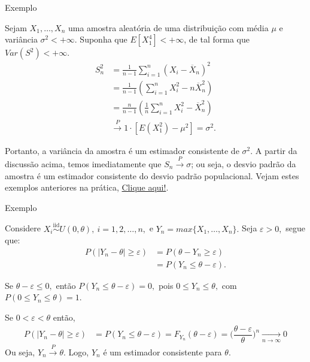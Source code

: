 \documentclass[12pt]{beamer}
\begin{document}
\begin{frame}{Exemplo}
\begin{block}{}
\justifying
Sejam $X_1, \ldots, X_{n}$ uma amostra aleatória de uma distribuição com média $\mu$ e variância $\sigma^{2}<+\infty$. Suponha que $E[X^{4}_{1}] < +\infty$, de tal forma que $Var(S^{2}) < +\infty$. 
\begin{align*}
S^2_{n} &= \frac{1}{n-1} \sum_{i=1}^n (X_i - \overline{X}_{n})^2 \\
&=\frac{1}{n-1} \left(\sum_{i=1}^n X_{i}^{2} - n\overline{X}_{n}^{2}\right)\\
&= \frac{n}{n-1} \left(\frac{1}{n}\sum_{i=1}^n X^2_i - \overline{X}^{2}_{n}\right) \\
&\xrightarrow{P} 1 \cdot [E(X^2_1) - \mu^2] = \sigma^2.
\end{align*}
\end{block}
\end{frame}

\begin{frame}{}
\begin{block}{}
\justifying
Portanto, a variância da amostra é um estimador consistente de $\sigma^2$. A partir da discussão acima, temos imediatamente que $S_{n} \xrightarrow{P} \sigma$; ou seja, o desvio padrão da amostra é um estimador consistente do desvio padrão populacional. Vejam estes exemplos anteriores na prática, \href{https://est711.shinyapps.io/ConvergenciaProbabilidade/}{Clique aqui!}.
\end{block}
\end{frame}

\begin{frame}{Exemplo}
\vspace{-0.3cm}
\begin{block}{}
\justifying
Considere $X_{i}\overset{\text{iid}}{\sim} U(0,\theta),~i=1,2,\ldots,n,$ e $Y_{n}=max\{X_{1}, \ldots, X_{n}\}.$ Seja $\varepsilon>0,$ segue que:
\begin{align*}
    P(|Y_{n}-\theta|\geq \varepsilon)&=P(\theta-Y_{n}\geq \varepsilon)\\
    &=P(Y_{n}\leq \theta-\varepsilon).
\end{align*}
\end{block}
\pause
\begin{block}{}
\justifying
Se $\theta-\varepsilon\leq 0,$ então $P(Y_{n}\leq \theta-\varepsilon)=0,$ pois $0\leq Y_{n}\leq \theta,$ com $P(0\leq Y_{n}\leq \theta)=1.$
\end{block}
\pause
\begin{block}{}
\justifying
Se $0<\varepsilon<\theta$ então,
\begin{align*}
P(|Y_{n}-\theta|\geq \varepsilon)&=P(Y_{n}\leq \theta- \varepsilon)=F_{Y_{n}}(\theta-\varepsilon)=\Big(\dfrac{\theta-\varepsilon}{\theta}\Big)^{n}\xrightarrow[n\rightarrow\infty]{} 0
\end{align*}
Ou seja, $Y_{n} \xrightarrow{P} \theta.$ Logo, $Y_{n}$ é um estimador consistente para $\theta.$
\end{block}
\end{frame}
\end{document}
